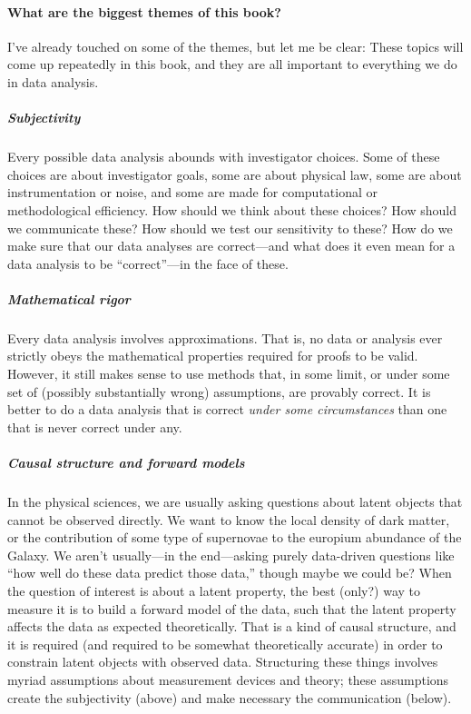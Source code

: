 \paragraph{What are the biggest themes of this book?}
I've already touched on some of the themes, but let me be clear:
These topics will come up repeatedly in this book, and they are all important to everything we do in data analysis.

\subparagraph{Subjectivity}
Every possible data analysis abounds with investigator choices.
Some of these choices are about investigator goals, some are about physical law, some are about instrumentation or noise, and some are made for computational or methodological efficiency.
How should we think about these choices?
How should we communicate these?
How should we test our sensitivity to these?
How do we make sure that our data analyses are correct---and what does it even mean for a data analysis to be ``correct''---in the face of these.

\subparagraph{Mathematical rigor}
Every data analysis involves approximations.
That is, no data or analysis ever strictly obeys the mathematical properties required for proofs to be valid.
However, it still makes sense to use methods that, in some limit, or under some set of (possibly substantially wrong) assumptions, are provably correct.
It is better to do a data analysis that is correct \emph{under some circumstances} than one that is never correct under any.

\subparagraph{Causal structure and forward models}
In the physical sciences, we are usually asking questions about latent objects that cannot be observed directly.
We want to know the local density of dark matter, or the contribution of some type of supernovae to the europium abundance of the Galaxy.
We aren't usually---in the end---asking purely data-driven questions like ``how well do these data predict those data,'' though maybe we could be?
When the question of interest is about a latent property, the best (only?) way to measure it is to build a forward model of the data, such that the latent property affects the data as expected theoretically.
That is a kind of causal structure, and it is required (and required to be somewhat theoretically accurate) in order to constrain latent objects with observed data.
Structuring these things involves myriad assumptions about measurement devices and theory; these assumptions create the subjectivity (above) and make necessary the communication (below).

